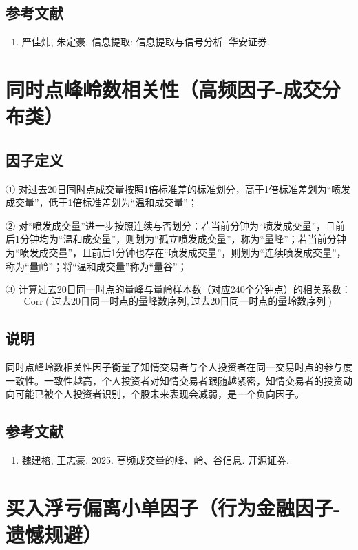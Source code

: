 \documentclass{article}
\begin{document}
\subsection{参考文献}
\begin{enumerate}
    \item 严佳炜, 朱定豪. 信息提取: 信息提取与信号分析. 华安证券.
\end{enumerate}

\section{同时点峰岭数相关性（高频因子-成交分布类）}

\subsection{因子定义}

① 对过去20日同时点成交量按照1倍标准差的标准划分，高于1倍标准差划为“喷发成交量”，低于1倍标准差划为“温和成交量”；

② 对“喷发成交量”进一步按照连续与否划分：若当前分钟为“喷发成交量”，且前后1分钟均为“温和成交量”，则划为“孤立喷发成交量”，称为“量峰”；若当前分钟为“喷发成交量”，且前后1分钟也存在“喷发成交量”，则划为“连续喷发成交量”，称为“量岭”；将“温和成交量”称为“量谷”；

③ 计算过去20日同一时点的量峰与量岭样本数（对应240个分钟点）的相关系数：
\begin{equation}
    \mathrm{Corr}(\text{过去20日同一时点的量峰数序列}, \text{过去20日同一时点的量岭数序列})
\end{equation}

\subsection{说明}
同时点峰岭数相关性因子衡量了知情交易者与个人投资者在同一交易时点的参与度一致性。一致性越高，个人投资者对知情交易者跟随越紧密，知情交易者的投资动向可能已被个人投资者识别，个股未来表现会减弱，是一个负向因子。

\subsection{参考文献}
\begin{enumerate}
    \item 魏建榕, 王志豪. 2025. 高频成交量的峰、岭、谷信息. 开源证券.
\end{enumerate}

\section{买入浮亏偏离小单因子（行为金融因子-遗憾规避）}
\end{document}
